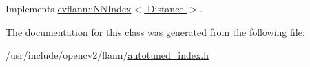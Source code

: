 Implements \hyperlink{classcvflann_1_1NNIndex_acdcc255d1b67d5636a0f76b68809e6be}{cvflann\-::\-N\-N\-Index$<$ Distance $>$}.



The documentation for this class was generated from the following file\-:\begin{DoxyCompactItemize}
\item 
/usr/include/opencv2/flann/\hyperlink{autotuned__index_8h}{autotuned\-\_\-index.\-h}\end{DoxyCompactItemize}
